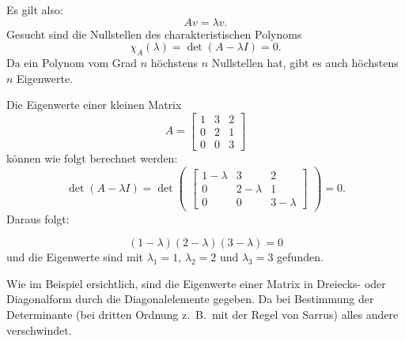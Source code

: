 Es gilt also:
\begin{equation}
	Av=\lambda v.
\end{equation}
Gesucht sind die Nullstellen des charakteristischen Polynoms
%
\begin{equation}
	\chi_A(\lambda)=\det(A-\lambda I) = 0.
\end{equation}
 Da ein Polynom vom Grad $n$ höchstens $n$ Nullstellen hat, gibt es auch höchstens $n$ Eigenwerte.

\begin{beispiel}
Die Eigenwerte einer kleinen Matrix
	\begin{equation}
	A =
	\begin{bmatrix}
	1 & 3 & 2 \\
	0 & 2 & 1 \\
	0 & 0 & 3
	\end{bmatrix}
	\end{equation}
können wie folgt berechnet werden:
	\begin{equation}
	\det(A-\lambda I)= \det
	\begin{pmatrix}
	\begin{bmatrix}
	1-\lambda & 3 & 2 \\
	0 & 2-\lambda & 1 \\
	0 & 0 & 3-\lambda
	\end{bmatrix}
	\end{pmatrix}
	= 0.
	\end{equation}
Daraus folgt:
	
	\begin{equation} 
	(1-\lambda)(2-\lambda)(3-\lambda)=0
	\end{equation}
und die Eigenwerte sind mit $\lambda_{1}=1$, $\lambda_{2}=2$ und $\lambda_{3}=3$ gefunden.
\end{beispiel}

Wie im Beispiel ersichtlich, sind die Eigenwerte einer Matrix in Dreiecks- oder Diagonalform durch die Diagonalelemente gegeben.
Da bei Bestimmung der Determinante (bei dritten Ordnung z.~B.~mit der Regel
von Sarrus) alles andere verschwindet.
%
%

